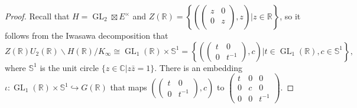 \documentclass[10pt,a4paper]{amsart}
\DeclareMathOperator{\GL}{\mathrm{GL}}
\def\CC{\mathbb{C}}
\def\RR{\mathbb{R}}
\begin{document}
\begin{proof}
   Recall that $H = \GL_2 \boxtimes E^{\times} $ and $Z(\RR) = \left \{(\begin{pmatrix}
                                                        z & 0 \\
                                                        0 & z \\ 
                                                    \end{pmatrix}, z) | z \in \RR \right \}$, so it follows from the Iwasawa decomposition that  
    \begin{equation*}
        Z(\RR) U_2(\RR) \backslash H(\RR) / K_{\infty} \cong \GL_1(\RR) \times \mathbb{S}^{1} = \left \{ (\begin{pmatrix}
                                                                                                    t & 0 \\
                                                                                                    0 & t^{-1} 
                                                                                                \end{pmatrix}, c) | t \in \GL_1(\RR), c \in \mathbb{S}^{1} \right \}, 
    \end{equation*}
    where $\mathbb{S}^{1}$ is the unit circle $\{ z \in \CC | z\bar{z} = 1 \}$. There is an embedding 
   $\iota \colon \GL_1(\RR) \times \mathbb{S}^{1} \hookrightarrow G(\RR)$ that maps $(\begin{pmatrix}
                                                                                    t & 0 \\
                                                                                    0 & t^{-1} 
                                                                                 \end{pmatrix}, c) $ to $\left(\begin{matrix}
                                                                                                            t & 0 & 0 \\
                                                                                                            0 & c & 0 \\
                                                                                                            0 & 0 & t^{-1} 
                                                                                                            \end{matrix}   \right)$. 

\end{proof}
\end{document}
